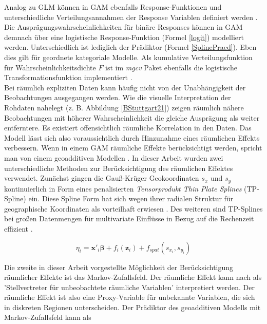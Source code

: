 \documentclass{Vorlage}
\begin{document}
Analog zu GLM können in GAM ebenfalls Response-Funktionen und unterschiedliche Verteilungsannahmen der Response Variablen definiert werden \cite[p. 448]{fahrmeir2013regression}. Die Ausprägungswahrscheinlichkeiten für binäre Responses können in GAM demnach über eine logistische Response-Funktion (Formel \ref{logit}) modelliert werden. Unterschiedlich ist lediglich der Prädiktor (Formel \ref{SplinePraed}). Eben dies gilt für geordnete kategoriale Modelle. Als kumulative Verteilungsfunktion für Wahrscheinlichkeitsdichte $F$ ist im \textit{mgcv} Paket ebenfalls die logistische Transformationsfunktion implementiert \cite[p. 22]{wood2016}.\\

Bei räumlich expliziten Daten kann häufig nicht von der Unabhängigkeit der Beobachtungen ausgegangen werden. Wie die visuelle Interpretation der Rohdaten nahelegt (z. B. Abbildung \ref{BStuttgart21}) zeigen räumlich nähere Beobachtungen mit höherer Wahrscheinlichkeit die gleiche Ausprägung als weiter entferntere. Es existiert offensichtlich räumliche Korrelation in den Daten. Das Modell lässt sich also voraussichtlich durch Hinzunahme eines räumlichen Effekts verbessern. Wenn in einem GAM räumliche Effekte berücksichtigt werden, spricht man von einem geoadditiven Modellen \cite[p. 540]{fahrmeir2013regression}. In dieser Arbeit wurden zwei unterschiedliche Methoden zur Berücksichtigung des räumlichen Effektes verwendet. Zunächst gingen die Gauß-Krüger Geokoordinaten $s_x$ und $s_y$ kontinuierlich in Form eines penalisierten \textit{Tensorprodukt Thin Plate Splines} (TP-Spline) ein. Diese Spline Form hat sich wegen ihrer radialen Struktur für geographische Koordinaten als vorteilhaft erwiesen \cite[p. 354]{gu1993}. Des weiteren sind TP-Splines bei großen Datenmengen für multivariate Einflüsse in Bezug auf die Rechenzeit effizient \cite[p. 95 f.]{wood2003}.

\begin{equation}
\eta_{i} =\mathbf{x}'_i \boldsymbol{\beta}+f_{i}(\mathbf{z}_{i})+f_{spat}(s_{x_i},s_{y_i})
\end{equation}

Die zweite in dieser Arbeit vorgestellte Möglichkeit der Berücksichtigung räumlicher Effekte ist das Markov-Zufallsfeld. Der räumliche Effekt kann nach \cite[p. 541]{fahrmeir2013regression} als 'Stellvertreter für unbeobachtete räumliche Variablen' interpretiert werden. Der räumliche Effekt ist also eine Proxy-Variable für unbekannte Variablen, die sich in diskreten Regionen unterscheiden. Der Prädiktor des geoadditiven Modells mit Markov-Zufallsfeld kann als
\end{document}
